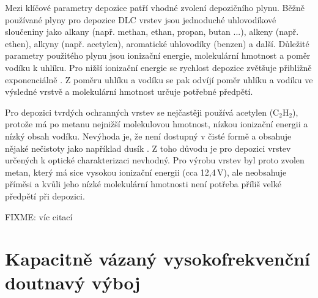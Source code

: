 Mezi klíčové parametry depozice patří vhodné zvolení depozičního plynu. Běžně používané plyny pro depozice DLC vrstev jsou jednoduché uhlovodíkové sloučeniny jako alkany (např. methan, ethan, propan, butan ...), alkeny (např. ethen), alkyny (např. acetylen), aromatické uhlovodíky (benzen) a další. Důležité parametry použitého plynu jsou ionizační energie, molekulární hmotnost a poměr vodíku k uhlíku. Pro nižší ionizační energie se rychlost depozice zvětšuje přibližně exponenciálně \cite{Koidl1991}. Z poměru uhlíku a vodíku se pak odvíjí poměr uhlíku a vodíku ve výsledné vrstvě a molekulární hmotnost určuje potřebné předpětí.

Pro depozici tvrdých ochranných vrstev se nejčastěji používá acetylen (C$_2$H$_2$), protože má po metanu nejnižší molekulovou hmotnost, nízkou ionizační energii a nízký obsah vodíku. Nevýhoda je, že není dostupný v čisté formě a obsahuje nějaké nečistoty jako například dusík \cite{Conway2000}. Z toho důvodu je pro depozici vrstev určených k optické charakterizaci nevhodný. Pro výrobu vrstev byl proto zvolen metan, který má sice vysokou ionizační energii (cca 12,4\,V), ale neobsahuje příměsi a kvůli jeho nízké molekulární hmotnosti není potřeba příliš velké předpětí při depozici.

FIXME: víc citací

\section{Kapacitně vázaný vysokofrekvenční doutnavý výboj}
\label{ccp}

